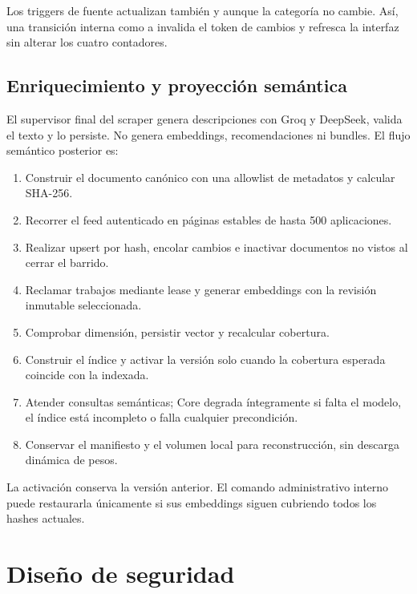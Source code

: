 Los triggers de fuente actualizan también  y  aunque la categoría no cambie. Así, una transición interna como  a  invalida el token de cambios y refresca la interfaz sin alterar los cuatro contadores.


\subsection{Enriquecimiento y proyección semántica}

El supervisor final del scraper genera descripciones con Groq y DeepSeek, valida el texto y lo persiste. No genera embeddings, recomendaciones ni bundles. El flujo semántico posterior es:

\begin{enumerate}
	\item Construir el documento canónico con una allowlist de metadatos y calcular SHA-256.
	\item Recorrer el feed autenticado en páginas estables de hasta 500 aplicaciones.
	\item Realizar upsert por hash, encolar cambios e inactivar documentos no vistos al cerrar el barrido.
	\item Reclamar trabajos mediante lease y generar embeddings con la revisión inmutable seleccionada.
	\item Comprobar dimensión, persistir vector y recalcular cobertura.
	\item Construir el índice y activar la versión solo cuando la cobertura esperada coincide con la indexada.
	\item Atender consultas semánticas; Core degrada íntegramente si falta el modelo, el índice está incompleto o falla cualquier precondición.
	\item Conservar el manifiesto y el volumen local para reconstrucción, sin descarga dinámica de pesos.
\end{enumerate}

La activación conserva la versión anterior. El comando administrativo interno puede restaurarla únicamente si sus embeddings siguen cubriendo todos los hashes actuales.

\section{Diseño de seguridad}

